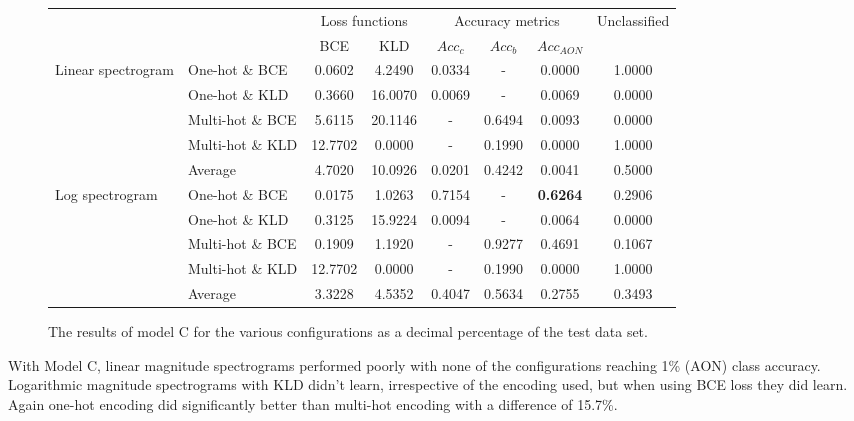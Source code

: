 \documentclass[12pt]{article}
\begin{document}
	\begin{figure}[H]
	    \centering
	    \begin{footnotesize}
    	    \begin{tabular}{l l|c|c|c|c|c|c|}
    	        & & \multicolumn{2}{c|}{Loss functions} & \multicolumn{3}{c|}{Accuracy metrics} & \multirow{2}{*}{Unclassified}\\
    	        \cline{3-7}
    	        & & BCE & KLD & $Acc_{c}$ & $Acc_{b}$ & $Acc_{AON}$ &\\
    	        \hline
    	       \multirow{4}{*}{Linear spectrogram}
    	        & One-hot \& BCE & 0.0602 & 4.2490 & 0.0334 & - & 0.0000 & 1.0000\\
    	        \cline{3-7}
    	        & One-hot \& KLD & 0.3660 & 16.0070 & 0.0069 & - & 0.0069 & 0.0000\\
    	        \cline{3-7}
    	        & Multi-hot \& BCE & 5.6115 & 20.1146 & - & 0.6494 & 0.0093 & 0.0000\\
    	        \cline{3-7}
    	        & Multi-hot \& KLD & 12.7702 & 0.0000 & - & 0.1990 & 0.0000 & 1.0000\\
    	        \bottomrule
    	        & Average & 4.7020 & 10.0926 & 0.0201 & 0.4242 & 0.0041 & 0.5000\\
    	        \bottomrule
    	       \multirow{4}{*}{Log spectrogram}
    	        & One-hot \& BCE & 0.0175 & 1.0263 & 0.7154 & - & \textbf{0.6264} & 0.2906\\
    	        \cline{3-7}
    	        & One-hot \& KLD & 0.3125 & 15.9224 & 0.0094 & - & 0.0064 & 0.0000\\
    	        \cline{3-7}
    	        & Multi-hot \& BCE & 0.1909 & 1.1920 & - & 0.9277 & 0.4691 & 0.1067\\
    	        \cline{3-7}
    	        & Multi-hot \& KLD & 12.7702 & 0.0000 & - & 0.1990 & 0.0000 & 1.0000\\
    	        \bottomrule
    	        & Average & 3.3228 & 4.5352 & 0.4047 & 0.5634 & 0.2755 & 0.3493\\
    	       \bottomrule
    	    \end{tabular}
    	\end{footnotesize}
	    \caption{The results of model C for the various configurations as a decimal percentage of the test data set.}
	    \label{fig:modelC}
	\end{figure}
	
	With Model C, linear magnitude spectrograms performed poorly with none of the configurations reaching 1\% (AON) class accuracy. Logarithmic magnitude spectrograms with KLD didn't learn, irrespective of the encoding used, but when using BCE loss they did learn. Again one-hot encoding did significantly better than multi-hot encoding with a difference of 15.7\%.
	
\end{document}
